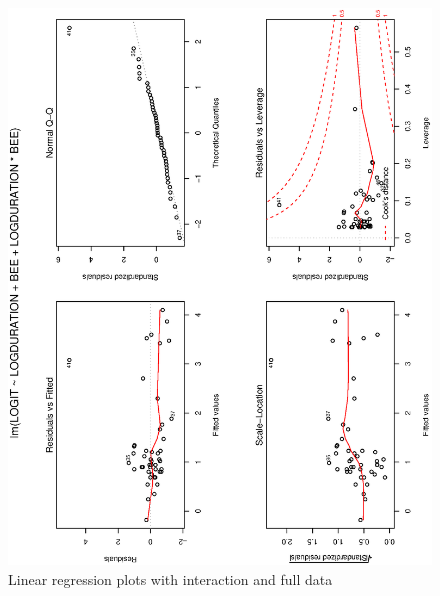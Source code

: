 \documentclass[a4paper,10pt]{article}
\begin{document}
\begin{figure}
\includegraphics[angle=-90, width=1\textwidth]{figures/math650_hw7_fig3.eps}
\caption{Linear regression plots with interaction and full data}\label{f3}
\end{figure}
\end{document}
